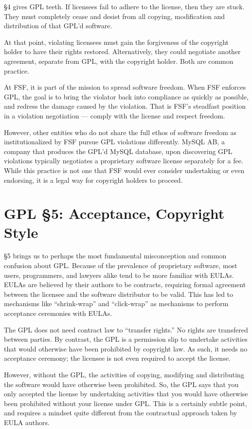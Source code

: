 \documentclass[11pt, letterpaper]{book}
\begin{document}
\S 4 gives GPL teeth. If licensees fail to adhere to the license, then
they are stuck. They must completely cease and desist from all
copying, modification and distribution of that GPL'd software.

At that point, violating licensees must gain the forgiveness of the
copyright holder to have their rights restored. Alternatively, they could
negotiate another agreement, separate from GPL, with the copyright
holder. Both are common practice.

At FSF, it is part of the mission to spread software freedom. When FSF
enforces GPL, the goal is to bring the violator back into compliance as
quickly as possible, and redress the damage caused by the violation.
That is FSF's steadfast position in a violation negotiation --- comply
with the license and respect freedom.

However, other entities who do not share the full ethos of software
freedom as institutionalized by FSF pursue GPL violations differently.
MySQL AB, a company that produces the GPL'd MySQL database, upon
discovering GPL violations typically negotiates a proprietary software
license separately for a fee. While this practice is not one that FSF
would ever consider undertaking or even endorsing, it is a legal way for
copyright holders to proceed.

\section{GPL \S 5: Acceptance, Copyright Style}
\label{GPLs5}

\S 5 brings us to perhaps the most fundamental misconception and common
confusion about GPL\@. Because of the prevalence of proprietary software,
most users, programmers, and lawyers alike tend to be more familiar with
EULAs. EULAs are believed by their authors to be contracts, requiring
formal agreement between the licensee and the software distributor to be
valid. This has led to mechanisms like ``shrink-wrap'' and ``click-wrap''
as mechanisms to perform acceptance ceremonies with EULAs.

The GPL does not need contract law to ``transfer rights.''  No rights
are transfered between parties. By contrast, the GPL is a permission
slip to undertake activities that would otherwise have been prohibited
by copyright law. As such, it needs no acceptance ceremony; the
licensee is not even required to accept the license.

However, without the GPL, the activities of copying, modifying and
distributing the software would have otherwise been prohibited. So, the
GPL says that you only accepted the license by undertaking activities that
you would have otherwise been prohibited without your license under GPL\@.
This is a certainly subtle point, and requires a mindset quite different
from the contractual approach taken by EULA authors.
\end{document}
